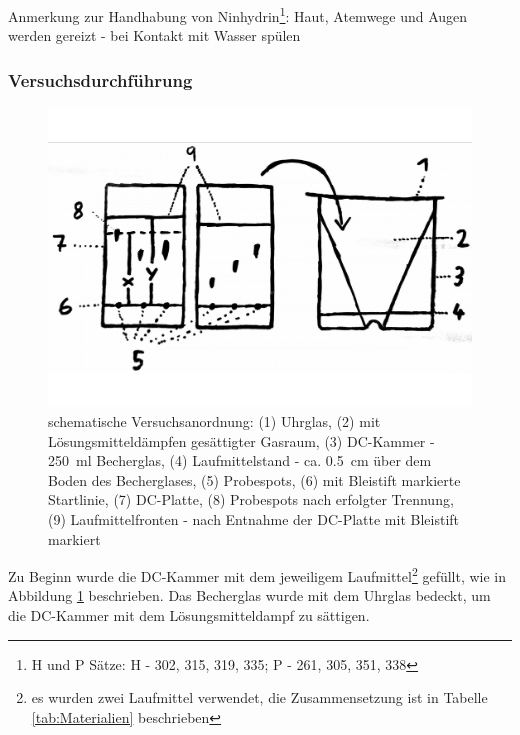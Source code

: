 \documentclass{article}
\begin{document}
        Anmerkung zur Handhabung von Ninhydrin\footnote{H und P Sätze: H - 302, 315, 319, 335; P - 261, 305, 351, 338}: Haut, Atemwege und Augen werden gereizt - bei Kontakt mit Wasser spülen
        
      \subsubsection{Versuchsdurchführung} \label{sec:Versuch}
        
        \begin{figure}[H]
          \includegraphics[scale=0.08, center]{Graphiken/Versuchsanordnungen/VersuchsanordnungDC.png} 
          \caption[schematische Versuchsanordnung Dünnschichtchromatographie, Quelle: Autor]{schematische Versuchsanordnung: (1) Uhrglas, (2) mit Lösungsmitteldämpfen gesättigter Gasraum, (3) DC-Kammer - \SI[mode=text,separate-uncertainty=true]{250}{\milli\litre} Becherglas, (4) Laufmittelstand - ca. \SI[mode=text]{0.5}{\centi\meter} über dem Boden des Becherglases, (5) Probespots, (6) mit Bleistift markierte Startlinie, (7) DC-Platte, (8) Probespots nach erfolgter Trennung, (9) Laufmittelfronten - nach Entnahme der DC-Platte mit Bleistift markiert}
          \label{fig:Versuchsanordnung}
        \end{figure}
    
        Zu Beginn wurde die DC-Kammer mit dem jeweiligem Laufmittel\footnote{es wurden zwei Laufmittel verwendet, die Zusammensetzung ist in Tabelle \ref{tab:Materialien} beschrieben} gefüllt, wie in Abbildung \ref{fig:Versuchsanordnung} beschrieben. Das Becherglas wurde mit dem Uhrglas bedeckt, um die DC-Kammer mit dem Lösungsmitteldampf zu sättigen. 
        
\end{document}
